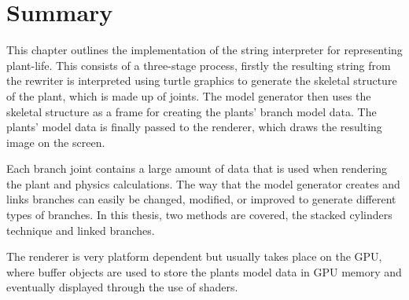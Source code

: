 \section{Summary}

This chapter outlines the implementation of the string interpreter for representing plant-life. This consists of a three-stage process, firstly the resulting string from the rewriter is interpreted using turtle graphics to generate the skeletal structure of the plant, which is made up of joints. The model generator then uses the skeletal structure as a frame for creating the plants' branch model data. The plants' model data is finally passed to the renderer, which draws the resulting image on the screen. 

Each branch joint contains a large amount of data that is used when rendering the plant and physics calculations. The way that the model generator creates and links branches can easily be changed, modified, or improved to generate different types of branches. In this thesis, two methods are covered, the stacked cylinders technique and linked branches. 

The renderer is very platform dependent but usually takes place on the GPU, where buffer objects are used to store the plants model data in GPU memory and eventually displayed through the use of shaders.







